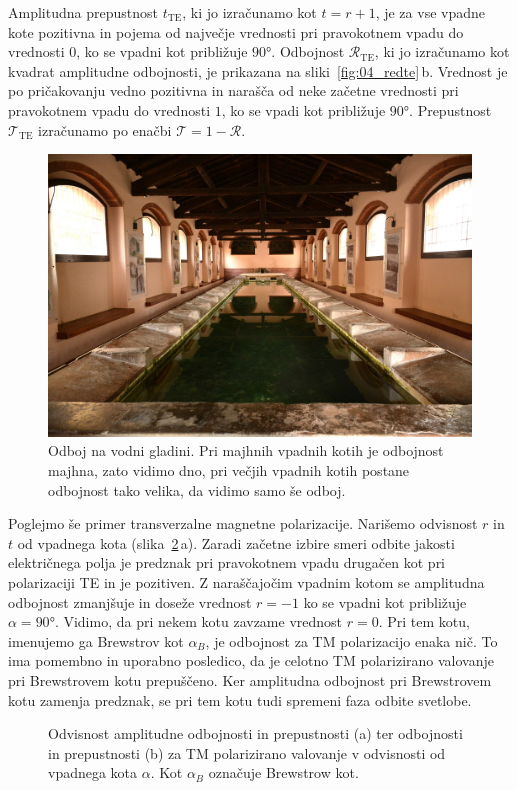 Amplitudna prepustnost $t_\mathrm{TE}$, ki jo izračunamo kot $t=r+1$, je za vse
vpadne kote pozitivna in pojema od največje vrednosti pri pravokotnem vpadu
do vrednosti $0$, ko se vpadni kot približuje $90\si{\degree}$. 
Odbojnost $\mathcal{R}_\mathrm{TE}$, ki jo izračunamo kot kvadrat amplitudne odbojnosti,
je prikazana na sliki~\ref{fig:04_redte}\,b. Vrednost je po pričakovanju 
vedno pozitivna in narašča od neke začetne vrednosti pri pravokotnem
vpadu do vrednosti $1$, ko se vpadi kot približuje $90\si{\degree}$. Prepustnost
$\mathcal{T}_\mathrm{TE}$ izračunamo po enačbi $\mathcal{T} = 1 -\mathcal{R}$. 
\begin{figure}[ht]
\centering
\includegraphics[width=10truecm]{slike/04_OdbojFoto.jpg}
\caption{Odboj na vodni gladini. Pri majhnih vpadnih kotih je odbojnost
majhna, zato vidimo dno, pri večjih
vpadnih kotih postane odbojnost tako velika, da vidimo samo še odboj.}
\label{fig:04_OdbojFoto}
\end{figure}

Poglejmo še primer transverzalne magnetne polarizacije. Narišemo odvisnost
$r$ in $t$ od vpadnega kota (slika~\ref{fig:04_redtm}\,a). Zaradi začetne 
izbire smeri odbite jakosti električnega polja je predznak pri pravokotnem vpadu drugačen kot pri 
polarizaciji TE in je pozitiven. Z naraščajočim vpadnim kotom se amplitudna
odbojnost zmanjšuje in doseže vrednost $r=-1$ ko se vpadni kot
približuje $\alpha = 90\si{\degree}$. Vidimo, da pri nekem kotu zavzame  
vrednost $r = 0$. Pri tem kotu, imenujemo ga Brewstrov kot $\alpha_B$, 
je odbojnost za TM polarizacijo enaka nič. To ima pomembno in uporabno
posledico, da je celotno TM polarizirano valovanje pri Brewstrovem kotu prepuščeno. 
Ker amplitudna odbojnost pri Brewstrovem kotu zamenja predznak, se pri tem
kotu tudi spremeni faza odbite svetlobe. 
\begin{figure}[ht]
\centering
\def\svgwidth{140truemm} 

\caption{Odvisnost amplitudne odbojnosti in prepustnosti (a) ter odbojnosti in 
prepustnosti (b) za TM polarizirano valovanje v odvisnosti od vpadnega kota $\alpha$. Kot
$\alpha_B$ označuje Brewstrow kot.}
\label{fig:04_redtm}
\end{figure}

